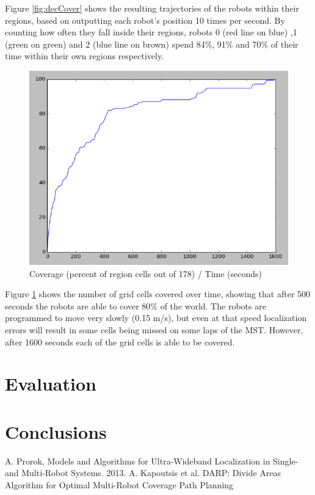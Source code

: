 \documentclass[a4paper, 10pt, conference]{ieeeconf}      %
\begin{document}
Figure \ref{fig:decCover} shows the resulting trajectories of the robots within their regions, based on outputting each robot's position 10 times per second. By counting how often they fall inside their regions, robots 0 (red line on blue) ,1 (green on green) and 2 (blue line on brown) spend 84\%, 91\% and 70\% of their time within their own regions respectively.

\begin{figure}
	\includegraphics[width=\columnwidth]{dec_t2_line_percent.png}
	\caption{Coverage (percent of region cells out of 178) / Time (seconds)}
    \label{fig:decLine}
\end{figure}

Figure \ref{fig:decLine} shows the number of grid cells covered over time, showing that after 500 seconds the robots are able to cover 80\% of the world. The robots are programmed to move very slowly (0.15 m/s), but even at that speed localization errors will result in some cells being missed on some laps of the MST. However, after 1600 seconds each of the grid cells is able to be covered.

\section{Evaluation}
\section{Conclusions}
\begin{thebibliography}{9}
 A. Prorok, Models and Algorithms for Ultra-Wideband Localization in Single- and Multi-Robot Systems. 2013.
 A. Kapoutsis et al. DARP: Divide Areas Algorithm for Optimal Multi-Robot Coverage Path Planning
\end{thebibliography}
\end{document}
